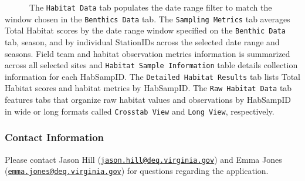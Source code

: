 \documentclass[
]{article}
\begin{document}
~~~~~~The \texttt{Habitat\ Data} tab populates the date range filter to
match the window chosen in the \texttt{Benthics\ Data} tab. The
\texttt{Sampling\ Metrics} tab averages Total Habitat scores by the date
range window specified on the \texttt{Benthic\ Data} tab, season, and by
individual StationIDs across the selected date range and seasons. Field
team and habitat observation metrics information is summarized across
all selected sites and \texttt{Habitat\ Sample\ Information} table
details collection information for each HabSampID. The
\texttt{Detailed\ Habitat\ Results} tab lists Total Habitat scores and
habitat metrics by HabSampID. The \texttt{Raw\ Habitat\ Data} tab
features tabs that organize raw habitat values and observations by
HabSampID in wide or long formats called \texttt{Crosstab\ View} and
\texttt{Long\ View}, respectively.

\hypertarget{contact-information}{%
\subsubsection{Contact Information}\label{contact-information}}

Please contact Jason Hill
(\href{mailto:jason.hill@deq.virginia.gov}{\nolinkurl{jason.hill@deq.virginia.gov}})
and Emma Jones
(\href{mailto:emma.jones@deq.virginia.gov}{\nolinkurl{emma.jones@deq.virginia.gov}})
for questions regarding the application.
\end{document}
